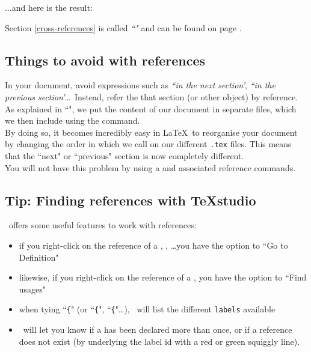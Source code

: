 $\ldots$and here is the result:
\begin{mdframed}
Section \ref{cross-references} 
is called \emph{``"} 
and can be found on page \pageref{cross-references}.
\end{mdframed}


\subsection{Things to avoid with references}

In your document, avoid expressions such as \emph{``in the next section'}, \emph{``in the previous section'}\dots\ Instead, refer the that section (or other object) by reference. \\

As explained in ``", we put the content of our document in separate files, which we then include using the  command. \\

By doing so, it becomes incredibly easy in \LaTeX\ to reorganise your document by changing the order in which we call  on our different \texttt{.tex} files.
This means that the ``next" or ``previous" section is now completely different. \\

You will not have this problem by using a  and associated reference commands.

\bigskip


\subsection{Tip: Finding references with \TeX studio}

\TeXstudio\ offers some useful features to work with references:

\begin{itemize}
	\item if you right-click on the reference of a , , \dots you have the option to ``Go to Definition"
	
	\item likewise, if you right-click on the reference of a , you have the option to ``Find usages"
	
	\item when tying ``\texttt{\{}" (or ``\texttt{\{}",  ``\texttt{\{}"\dots), \TeXstudio\ will list the different \texttt{labels} available
	
	\item \TeXstudio\ will let you know if a  has been declared more than once, or if a reference does not exist (by underlying the label id with a red or green squiggly line).
	
\end{itemize}



